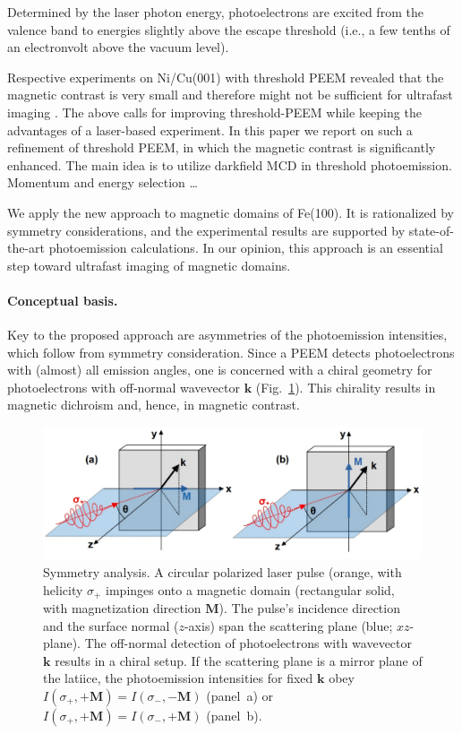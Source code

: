 \documentclass[prl,twocolumn,floatfix]{revtex4-2}
\renewcommand{\vec}[1]{\boldsymbol{#1}}
\begin{document}
Determined by the laser photon energy, photoelectrons are excited from the valence band to energies slightly above the escape threshold (i.e., a few tenths of an electronvolt above the vacuum level). 

Respective experiments on Ni/Cu(001) with threshold PEEM revealed that the magnetic contrast is very small and therefore might not be sufficient for ultrafast imaging .
The above calls for improving threshold-PEEM while keeping the advantages of a laser-based experiment. In this paper we report on such a refinement of threshold PEEM, in which the magnetic contrast is significantly enhanced. The main idea is to utilize darkfield MCD in threshold photoemission. Momentum and energy selection \ldots 

We apply the new approach to magnetic domains of Fe(100). It is rationalized by symmetry considerations, and the experimental results are supported by state-of-the-art photoemission calculations. In our opinion, this approach is an essential step toward ultrafast imaging of magnetic domains.

\paragraph{Conceptual basis.} Key to the proposed approach are asymmetries of the photoemission intensities, which follow from  symmetry consideration. Since a PEEM detects photoelectrons with (almost) all emission angles, one is concerned with a chiral geometry for photoelectrons with off-normal wavevector $\vec{k}$ (Fig.~\ref{fig:symmetry}). This chirality results in magnetic dichroism and, hence, in magnetic contrast.

\begin{figure}
    \centering
    \includegraphics[width = \columnwidth]{symmetry}
    \caption{Symmetry analysis. A circular polarized laser pulse (orange, with helicity $\sigma_{+}$ impinges onto a magnetic domain (rectangular solid, with magnetization direction $\vec{M}$). The pulse's incidence direction and the surface normal ($z$-axis) span the scattering plane (blue; $xz$-plane). The off-normal detection of photoelectrons with wavevector $\vec{k}$ results in a chiral setup. If the scattering plane is a mirror plane of the latiice, the photoemission intensities for fixed $\vec{k}$ obey $I(\sigma_{+}, +\vec{M}) = I(\sigma_{-}, -\vec{M})$ (panel~a) or $I(\sigma_{+}, +\vec{M}) = I(\sigma_{-}, +\vec{M})$ (panel~b).}
    \label{fig:symmetry}
\end{figure}
\end{document}
